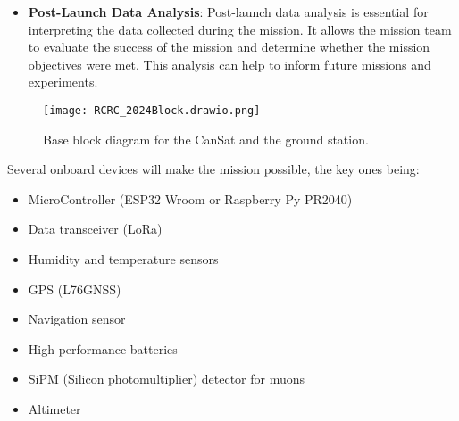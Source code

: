 \begin{itemize}[leftmargin=1.27cm, itemindent=0cm, topsep=2pt, label=\faTasks]
    \item[\faChartBar] \textbf{Post-Launch Data Analysis}: Post-launch data analysis is essential for interpreting the data collected during the mission. It allows the mission team to evaluate the success of the mission and determine whether the mission objectives were met. This analysis can help to inform future missions and experiments. 
\end{itemize}

%  

\begin{figure}[htbp]
\centering
\texttt{[image: RCRC\_2024Block.drawio.png]}
\caption{\small{Base block diagram for the CanSat and the ground station.}}
\label{fig:bloc_diagrame}
\end{figure}

Several onboard devices will make the mission possible, the key ones being:
    \begin{multicols}{2}[\vspace{-0.5\baselineskip}]
        \begin{itemize}[leftmargin=1.75cm,itemindent=0cm, noitemsep, topsep=2pt, label=\faCheck]
            \item[\faMicrochip] MicroController (ESP32 Wroom or Raspberry Py PR2040)
            \item[ \faWifi] Data transceiver (LoRa)
            \item[\faThermometerQuarter] Humidity and temperature sensors %
            \item[\faMapMarked] GPS (L76GNSS)
            \item[\faCompass] Navigation sensor %
            \item[\faBatteryHalf] High-performance batteries
            \item[\faRadiation] SiPM (Silicon photomultiplier) detector for muons
            \item[\newaltitudeicon] Altimeter %
        \end{itemize}
        \vspace*{-0.75\baselineskip}
    \end{multicols}

